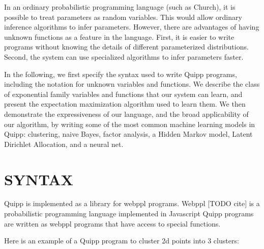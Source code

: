 \documentclass{article}
\begin{document}

  In an ordinary probabilistic programming language (such as Church),
  it is possible to treat parameters as random variables.  This
  would allow ordinary inference algorithms to infer parameters.  However,
  there are advantages of having unknown functions as a feature
  in the language.
  First, it is easier to
  write programs without knowing the details of different parameterized distributions.
  Second, the system can use specialized algorithms to infer parameters faster.



  In the following, we first specify the syntax used to write Quipp programs,
  including the notation for unknown variables and functions.
  We describe the class of exponential family variables and functions that our system can learn,
  and present the expectation maximization algorithm used to learn them.
  We then demonstrate the expressiveness of our language, and the broad
  applicability of our algorithm, by writing some of the most common machine learning models
  in Quipp: clustering, naive Bayes, factor analysis, a Hidden Markov model, Latent Dirichlet Allocation, and
  a neural net.
  
  \section{SYNTAX}

  Quipp is implemented as a library for webppl programs.  Webppl [TODO cite] is a probabilistic programming language
  implemented in Javascript   Quipp programs are written as webppl programs that have access to special functions.

  Here is an example of a Quipp program to cluster 2d points into 3 clusters:
\end{document}
